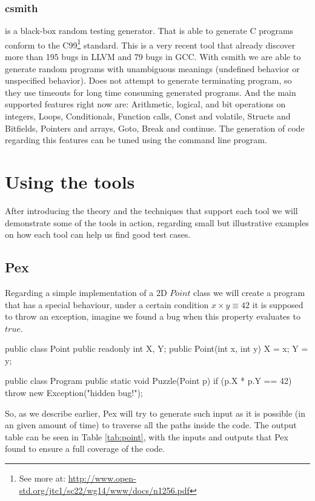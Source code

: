 \documentclass[10pt, conference, compsocconf]{IEEEtran}
\begin{document}
\subsubsection{\textbf{csmith}\cite{Yang:2011:FUB:1993316.1993532}} is a black-box random testing generator. That is able to generate C programs
conform to the C99\footnote{See more at: \url{http://www.open-std.org/jtc1/sc22/wg14/www/docs/n1256.pdf}} standard. This is a very recent tool that already discover
more than 195 bugs in LLVM and 79 bugs in GCC. With csmith we are able to generate random programs with unambiguous meanings (undefined behavior or 
unspecified behavior). Does not attempt to generate terminating program, so they use timeouts for long time consuming generated programs.
And the main supported features right now are: Arithmetic, logical, and bit operations on integers, Loops, Conditionals, Function calls, Const and volatile,
Structs and Bitfields, Pointers and arrays, Goto, Break and continue. The generation of code regarding this features can be tuned using the command line program.

\section{Using the tools}
After introducing the theory and the techniques that support each tool we will demonstrate some of the tools in action, regarding small but illustrative examples
on how each tool can help us find good test cases.

\subsection{Pex}
Regarding a simple implementation of a 2D $Point$ class we will create a program that has a special behaviour, under a certain condition
$x \times y \equiv 42$ it is supposed to throw an exception, imagine we found a bug when this property evaluates to $true$.

\begin{code}
public class Point  {
  public readonly int X, Y;
  public Point(int x, int y) { X = x; Y = y; }
}

public class Program {
  public static void Puzzle(Point p) {
    if (p.X * p.Y == 42)
        throw new Exception("hidden bug!");
  }
}
\end{code}

So, as we describe earlier, Pex will try to generate such input as it is possible (in an given amount of time) to traverse all the paths inside the code.
The output table can be seen in Table \ref{tab:point}, with the inputs and outputs that Pex found to ensure a full coverage of the code.
\end{document}
